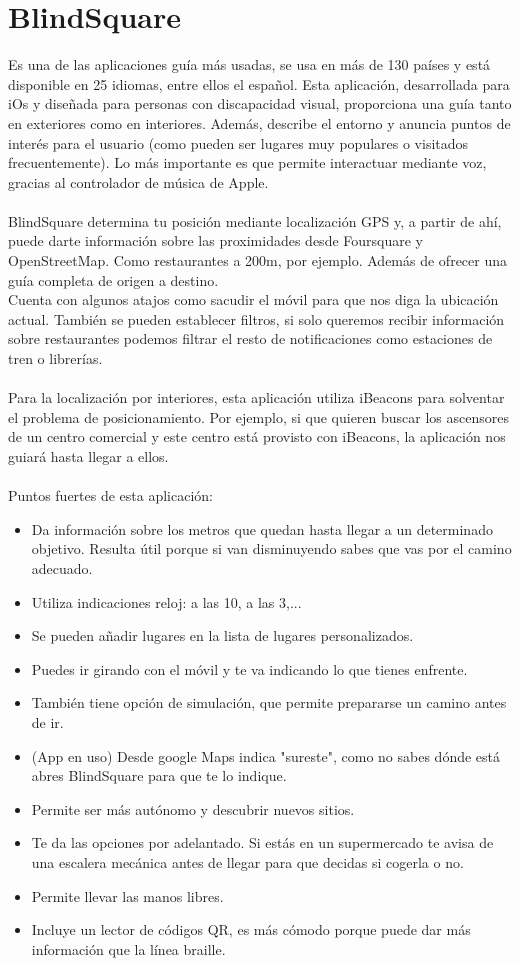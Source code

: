 \documentclass{article}
\begin{document}
	\section{BlindSquare}
	Es una de las aplicaciones guía más usadas, se usa en más de 130 países y está disponible en 25 idiomas, entre ellos el español. Esta aplicación, desarrollada para iOs y diseñada para personas con discapacidad visual, proporciona una guía tanto en exteriores como en interiores. Además, describe el entorno y anuncia puntos de interés para el usuario (como pueden ser lugares muy populares o visitados frecuentemente). Lo más importante es que permite interactuar mediante voz, gracias al controlador de música de Apple. 
	\\
	\\
	BlindSquare determina tu posición mediante localización GPS y, a partir de ahí, puede darte información sobre las proximidades desde Foursquare y OpenStreetMap. Como restaurantes a 200m, por ejemplo. Además de ofrecer una guía completa de origen a destino.
	\\
	Cuenta con algunos atajos como sacudir el móvil para que nos diga la ubicación actual. También se pueden establecer filtros, si solo queremos recibir información sobre restaurantes podemos filtrar el resto de notificaciones como estaciones de tren o librerías.
	\\
	\\
	Para la localización por interiores, esta aplicación utiliza iBeacons para solventar el problema de posicionamiento. Por ejemplo, si que quieren buscar los ascensores de un centro comercial y este centro está provisto con iBeacons, la aplicación nos guiará hasta llegar a ellos.
	\\
	\\
	Puntos fuertes de esta aplicación:
	\begin{itemize}
		\item Da información sobre los metros que quedan hasta llegar a un determinado objetivo. Resulta útil porque si van disminuyendo sabes que vas por el camino adecuado.
		\item Utiliza indicaciones reloj: a las 10, a las 3,...
		\item Se pueden añadir lugares en la lista de lugares personalizados.
		\item Puedes ir girando con el móvil y te va indicando lo que tienes enfrente. 
		\item También tiene opción de simulación, que permite prepararse un camino antes de ir.
		\item (App en uso) Desde google Maps indica "sureste", como no sabes dónde está abres BlindSquare para que te lo indique.
		\item Permite ser más autónomo y descubrir nuevos sitios.
		\item Te da las opciones por adelantado. Si estás en un supermercado te avisa de una escalera mecánica antes de llegar para que decidas si cogerla o no.
		\item Permite llevar las manos libres.
		\item Incluye un lector de códigos QR, es más cómodo porque puede dar más información que la línea braille.
	\end{itemize}
\end{document}
